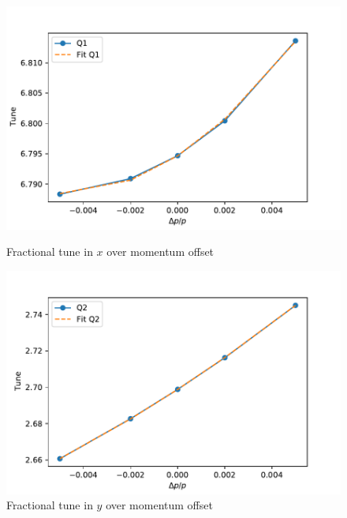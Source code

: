 \begin{figure}[tbp]
\begin{minipage}{0.49\textwidth}
        \centering
        \includegraphics[width=1.1\linewidth]{../../part3/3c_chroma.pdf}
        \caption{Fractional tune in $x$ over momentum offset}
        \label{fig:3cChroma1}
    \end{minipage}\hfill
    \begin{minipage}{0.49\textwidth}
        \centering
        \includegraphics[width=1.1\linewidth]{../../part3/3c_chroma2.pdf}
        \caption{Fractional tune in $y$ over momentum offset}
        \label{fig:3cChroma2}
    \end{minipage}
\end{figure}
\par
